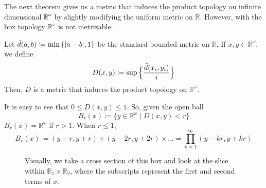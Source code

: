   The next theorem gives us a metric that induces the product topology on infinite dimensional $\mathbb{R}^\omega$ by slightly modifying the uniform metric on $\mathbb{R}$. However, with the box topology $\mathbb{R}^\omega$ is not metrizable. 

  \begin{theorem}
    Let $\Tilde{d} (a, b) \coloneqq \min{\{|a-b|, 1\}}$ be the standard bounded metric on $\mathbb{R}$. If $x, y \in \mathbb{R}^\omega$, we define
    \begin{equation}
      D(x, y) \coloneqq \sup{\Big\{ \frac{\Tilde{d}(x_i, y_i)}{i}\Big\}}
    \end{equation}
    Then, $D$ is a metric that induces the product topology on $\mathbb{R}^\omega$. 
  \end{theorem}
  
  It is easy to see that $0 \leq D(x, y) \leq 1$. So, given the open ball
  \begin{equation}
    B_r (x) \coloneqq \{y \in \mathbb{R}^\omega \; | \; D(x, y) < r\}
  \end{equation}
  $B_r (x) = \mathbb{R}^\omega$ if $r > 1$. When $r \leq 1$, 
  \begin{equation}
    B_r (x) \coloneqq (y-r, y+r) \times (y-2r, y+2r) \times ... = \prod_{k=1}^\infty (y - k r , y + k r)
  \end{equation}

  \begin{figure}[H]
    \centering 
    \caption{Visually, we take a cross section of this box and look at the slice within $\mathbb{R}_1 \times \mathbb{R}_2$, where the subscripts represent the first and second terms of $x$.}
    \label{fig:cross_sec}
  \end{figure}

